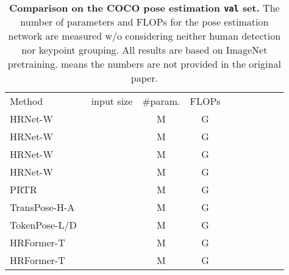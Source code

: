 \documentclass{article}
\begin{document}
\renewcommand{\arraystretch}{1.1}
\begin{table}[h]
  \footnotesize
  \setlength{\tabcolsep}{5pt}
  \renewcommand{\arraystretch}{1.3}
  \centering
  \caption{\textbf{Comparison on the COCO pose estimation \texttt{val} set.}
    The number of parameters and FLOPs
    for the pose estimation network are measured w/o considering
    neither human detection nor keypoint grouping.
    All results are based on ImageNet pretraining.
     means the numbers are not provided in the original paper.
  }
  \label{tab:coco_pose_val}
  \footnotesize
  {
    \begin{tabular}{l|ccc|cccccc}
      \shline
      Method                                    & input size               & \#param.                 & FLOPs                   &
                             &  &  &  &  &                                              \\\shline
      HRNet-W~\cite{XLW19}                  &           & M                  & G                  &                 &             &  &  &  &  \\
      HRNet-W~\cite{XLW19}                  &           & M                  & G                 &                 &             &  &  &  &  \\
      HRNet-W~\cite{XLW19}                  &           & M                  & G                 &                 &             &  &  &  &  \\
      HRNet-W~\cite{XLW19}                  &           & M                  & G                 &                 &             &  &  &  &  \\
      PRTR~\cite{li2021pose}                    &           & M                  & G                 &                 &             &  &  &  &  \\
      TransPose-H-A~\cite{yang2020transpose} &           & M                  & G                 &                 &                &     &     &     &  \\
      TokenPose-L/D~\cite{li2021tokenpose}  &           & M                  & G                 &                 &             &  &  &  &  \\\hline
      HRFormer-T                                &           & M                   & G                  &                 &             &    &    &  &  \\
      HRFormer-T                                &           & M                   & G                  &                 &             &  &  &  &  \\

\end{tabular}}
\end{table}
\end{document}
